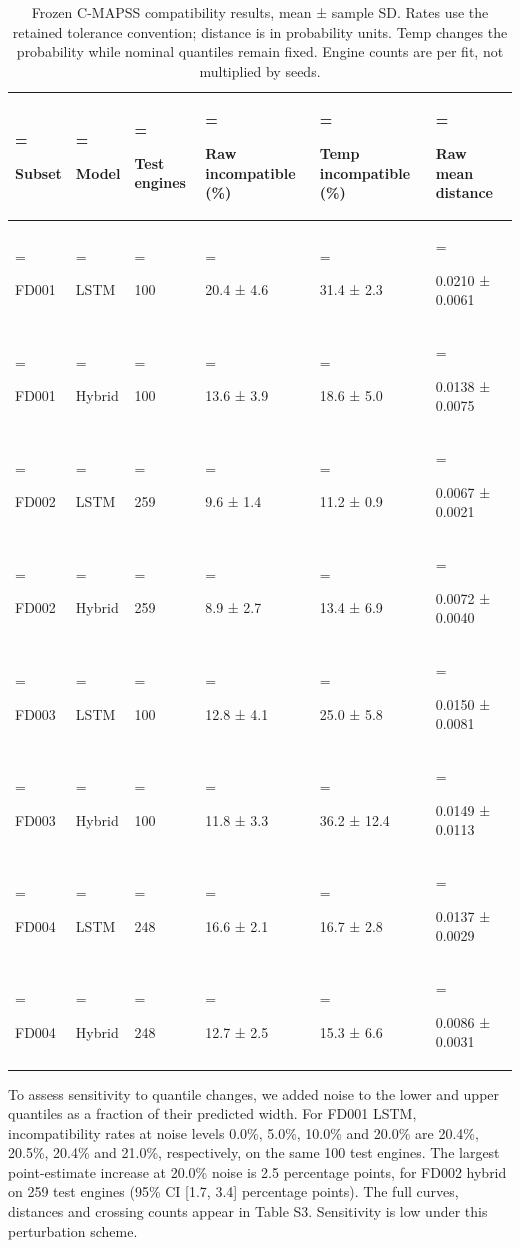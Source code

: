 \documentclass[IJPHM, 2026, 0]{phmsociety}
\begin{document}
\begin{table}[t]
\centering
\normalsize
\setlength{\tabcolsep}{3pt}
\renewcommand{\arraystretch}{1.12}
\setcounter{table}{1}
\caption{Frozen C-MAPSS compatibility results, mean ± sample SD. Rates use the retained tolerance convention; distance is in probability units. Temp changes the probability while nominal quantiles remain fixed. Engine counts are per fit, not multiplied by seeds.}
\label{tab:2}
\begin{tabularx}{\textwidth}{@{}>{\hsize=0.620000\hsize\linewidth=\hsize\raggedright\arraybackslash}X>{\hsize=0.650000\hsize\linewidth=\hsize\raggedright\arraybackslash}X>{\hsize=0.700000\hsize\linewidth=\hsize\raggedright\arraybackslash}X>{\hsize=1.320000\hsize\linewidth=\hsize\raggedright\arraybackslash}X>{\hsize=1.320000\hsize\linewidth=\hsize\raggedright\arraybackslash}X>{\hsize=1.390000\hsize\linewidth=\hsize\raggedright\arraybackslash}X@{}}
\toprule
Subset & Model & Test engines & Raw incompatible (\%) & Temp incompatible (\%) & Raw mean distance \\
\midrule
FD001 & LSTM & \mbox{100} & \mbox{20.4} ± \mbox{4.6} & \mbox{31.4} ± \mbox{2.3} & \mbox{0.0210} ± \mbox{0.0061} \\
FD001 & Hybrid & \mbox{100} & \mbox{13.6} ± \mbox{3.9} & \mbox{18.6} ± \mbox{5.0} & \mbox{0.0138} ± \mbox{0.0075} \\
FD002 & LSTM & \mbox{259} & \mbox{9.6} ± \mbox{1.4} & \mbox{11.2} ± \mbox{0.9} & \mbox{0.0067} ± \mbox{0.0021} \\
FD002 & Hybrid & \mbox{259} & \mbox{8.9} ± \mbox{2.7} & \mbox{13.4} ± \mbox{6.9} & \mbox{0.0072} ± \mbox{0.0040} \\
FD003 & LSTM & \mbox{100} & \mbox{12.8} ± \mbox{4.1} & \mbox{25.0} ± \mbox{5.8} & \mbox{0.0150} ± \mbox{0.0081} \\
FD003 & Hybrid & \mbox{100} & \mbox{11.8} ± \mbox{3.3} & \mbox{36.2} ± \mbox{12.4} & \mbox{0.0149} ± \mbox{0.0113} \\
FD004 & LSTM & \mbox{248} & \mbox{16.6} ± \mbox{2.1} & \mbox{16.7} ± \mbox{2.8} & \mbox{0.0137} ± \mbox{0.0029} \\
FD004 & Hybrid & \mbox{248} & \mbox{12.7} ± \mbox{2.5} & \mbox{15.3} ± \mbox{6.6} & \mbox{0.0086} ± \mbox{0.0031} \\
\bottomrule
\end{tabularx}
\end{table}

To assess sensitivity to quantile changes, we added noise to the lower and upper quantiles as a fraction of their predicted width. For FD001 LSTM, incompatibility rates at noise levels \mbox{0.0}\%, \mbox{5.0}\%, \mbox{10.0}\% and \mbox{20.0}\% are \mbox{20.4}\%, \mbox{20.5}\%, \mbox{20.4}\% and \mbox{21.0}\%, respectively, on the same \mbox{100} test engines. The largest point-estimate increase at \mbox{20.0}\% noise is \mbox{2.5} percentage points, for FD002 hybrid on \mbox{259} test engines (\mbox{95}\% CI {[}\mbox{1.7}, \mbox{3.4}{]} percentage points). The full curves, distances and crossing counts appear in Table S3. Sensitivity is low under this perturbation scheme.
\end{document}
